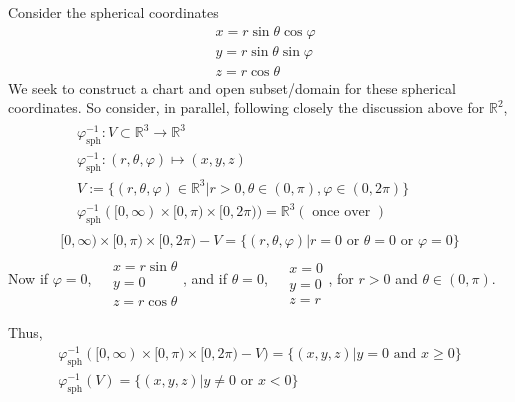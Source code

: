 \documentclass[10pt, twoside]{amsart}
\begin{document}
\begin{multicols*}{2}
Consider the spherical coordinates
\begin{equation}\label{Eq:R3sphericalcoordinates}
\begin{aligned}
  & x = r\sin{\theta} \cos{\varphi} \\ 
   & y = r\sin{\theta} \sin{\varphi} \\ 
  & z = r\cos{\theta}
\end{aligned}
\end{equation}
We seek to construct a chart and open subset/domain for these spherical coordinates.  So consider, in parallel, following closely the discussion above for $\mathbb{R}^2$, 
\[
\begin{gathered}
\begin{aligned}
  & \varphi_{\text{sph}}^{-1} : V \subset \mathbb{R}^3 \to \mathbb{R}^3 \\ 
  & \varphi^{-1}_{\text{sph}}:(r,\theta, \varphi) \mapsto (x,y,z) \\ 
  & V:= \lbrace (r,\theta,\varphi) \in \mathbb{R}^3 | r>0, \theta \in (0,\pi), \varphi \in (0,2\pi) \rbrace \\
  & \varphi_{\text{sph}}^{-1}([0,\infty) \times [0,\pi) \times [0,2\pi) ) = \mathbb{R}^3 (\text{ once over })
\end{aligned}  \\
[0,\infty) \times [0,\pi) \times [0,2\pi) - V = \lbrace (r,\theta, \varphi) | r= 0 \text{ or } \theta = 0 \text{ or } \varphi = 0 \rbrace
\end{gathered}
\]
Now if $\varphi=0$, $\begin{aligned} & \quad \\ 
  & x = r\sin{\theta}\\
  & y = 0 \\
  & z = r \cos{\theta} \end{aligned}$, and if $\theta =0$, $\begin{aligned} & \quad \\
  & x = 0 \\
  & y = 0 \\
  & z = r \end{aligned}$, for $r>0$ and $\theta \in (0,\pi)$.  

Thus,
\[
\begin{gathered}
  \varphi^{-1}_{\text{sph}}([0,\infty) \times [0,\pi) \times [0,2\pi) - V) = \lbrace (x,y,z) | y=0 \text{ and } x \geq 0 \rbrace \\ 
        \varphi^{-1}_{\text{sph}}(V) = \lbrace (x,y,z) | y \neq 0 \text{ or } x < 0 \rbrace 
\end{gathered}
\]


\end{multicols*}
\end{document}
